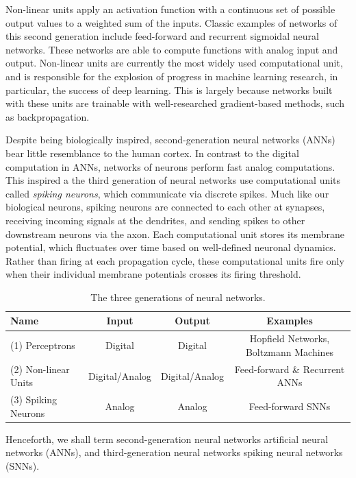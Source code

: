 \documentclass[fyp]{socreport}
\begin{document}
Non-linear units apply an activation function with a continuous set of possible
output values to a weighted sum of the inputs. Classic examples of networks of
this second generation include feed-forward and recurrent sigmoidal neural
networks. These networks are able to compute functions with analog input and
output. Non-linear units are currently the most widely used computational unit,
and is responsible for the explosion of progress in machine learning research,
in particular, the success of deep learning. This is largely because networks
built with these units are trainable with well-researched gradient-based
methods, such as backpropagation.

Despite being biologically inspired, second-generation neural networks (ANNs)
bear little resemblance to the human cortex. In contrast to the digital
computation in ANNs, networks of neurons perform fast analog computations. This
inspired a the third generation of neural networks use computational units
called \emph{spiking neurons}, which communicate via discrete spikes. Much like
our biological neurons, spiking neurons are connected to each other at synapses,
receiving incoming signals at the dendrites, and sending spikes to other
downstream neurons via the axon. Each computational unit stores its membrane
potential, which fluctuates over time based on well-defined neuronal dynamics.
Rather than firing at each propagation cycle, these computational units fire
only when their individual membrane potentials crosses its firing threshold.

\begin{table}
  \centering
  \small
  \begin{tabular}{ l ccc }
    \toprule
    \textbf{Name} & \textbf{Input} & \textbf{Output} & \textbf{Examples} \\
    \midrule
    (1) Perceptrons & Digital & Digital & Hopfield Networks, Boltzmann Machines \\
    (2) Non-linear Units & Digital/Analog & Digital/Analog & Feed-forward \& Recurrent ANNs \\
    (3) Spiking Neurons & Analog & Analog & Feed-forward SNNs \\
    \bottomrule
  \end{tabular}
  \normalsize
  \caption{\label{tab:nn_generations} The three generations of neural networks. }
\end{table}

Henceforth, we shall term second-generation neural networks artificial neural
networks (ANNs), and third-generation neural networks spiking neural networks
(SNNs).
\end{document}
